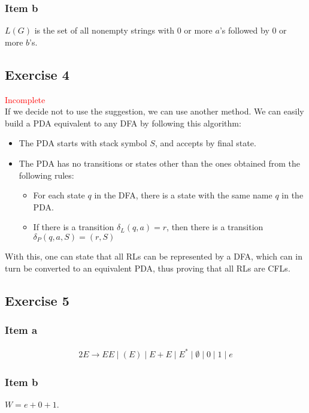 {\subsubsection{Item b}
$L(G)$ is the set of all nonempty strings with 0 or more $a$'s followed by 0 or more $b$'s.
\subsection{Exercise 4}
\textcolor{red}{Incomplete}\\
If we decide not to use the suggestion, we can use another method. We can easily build a PDA equivalent to any DFA by following this algorithm:
\begin{itemize}
	\item The PDA starts with stack symbol $S$, and accepts by final state.
	\item The PDA has no transitions or states other than the ones obtained from the following rules:
	\begin{itemize}
		\item For each state $q$ in the DFA, there is a state with the same name $q$ in the PDA.
		\item If there is a transition $\delta_L(q,a)=r$, then there is a transition $\delta_P(q,a,S)=(r,S)$
	\end{itemize}
\end{itemize}
With this, one can state that all RLs can be represented by a DFA, which can in turn be converted to an equivalent PDA, thus proving that all RLs are CFLs.
\pagebreak
\subsection{Exercise 5}
\subsubsection{Item a}
\begin{alignat*}{2}
	E \rightarrow EE\mid (E)\mid E+E\mid E^*\mid \emptyset\mid 0\mid 1\mid e
\end{alignat*}
\subsubsection{Item b}
$W=e+0+1$.\\
\begin{minipage}[t]{0.49\textwidth}
\begin{center}
\end{center}
\end{minipage}%
\begin{minipage}[t]{0.49\textwidth}
\begin{center}
\end{center}
\end{minipage}
}
